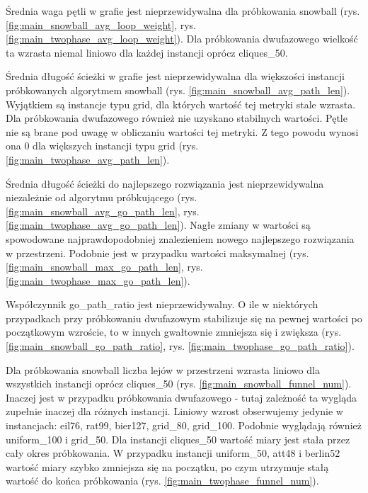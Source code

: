 Średnia waga pętli w grafie jest nieprzewidywalna dla próbkowania snowball (rys. \ref{fig:main_snowball_avg_loop_weight}, rys. \ref{fig:main_twophase_avg_loop_weight}).
Dla próbkowania dwufazowego wielkość ta wzrasta niemal liniowo dla każdej instancji oprócz cliques\_50.

Średnia długość ścieżki w grafie jest nieprzewidywalna dla większości instancji próbkowanych algorytmem snowball (rys. \ref{fig:main_snowball_avg_path_len}).
Wyjątkiem są instancje typu grid, dla których wartość tej metryki stale wzrasta.
Dla próbkowania dwufazowego również nie uzyskano stabilnych wartości.
Pętle nie są brane pod uwagę w obliczaniu wartości tej metryki. Z tego powodu wynosi ona 0 dla większych instancji typu grid (rys. \ref{fig:main_twophase_avg_path_len}).

Średnia długość ścieżki do najlepszego rozwiązania jest nieprzewidywalna niezależnie od algorytmu próbkującego (rys. \ref{fig:main_snowball_avg_go_path_len}, rys. \ref{fig:main_twophase_avg_go_path_len}).
Nagłe zmiany w wartości są spowodowane najprawdopodobniej znalezieniem nowego najlepszego rozwiązania w przestrzeni.
Podobnie jest w przypadku wartości maksymalnej (rys. \ref{fig:main_snowball_max_go_path_len}, rys. \ref{fig:main_twophase_max_go_path_len}).

Współczynnik go\_path\_ratio jest nieprzewidywalny. O ile w niektórych przypadkach przy próbkowaniu dwufazowym stabilizuje się na pewnej wartości
po początkowym wzroście, to w innych gwałtownie zmniejsza się i zwiększa (rys. \ref{fig:main_snowball_go_path_ratio}, rys. \ref{fig:main_twophase_go_path_ratio}).

Dla próbkowania snowball liczba lejów w przestrzeni wzrasta liniowo dla wszystkich instancji oprócz cliques\_50 (rys. \ref{fig:main_snowball_funnel_num}).
Inaczej jest w przypadku próbkowania dwufazowego - tutaj zależność ta wygląda zupełnie inaczej dla różnych instancji.
Liniowy wzrost obserwujemy jedynie w instancjach: eil76, rat99, bier127, grid\_80, grid\_100. Podobnie wyglądają również uniform\_100 i grid\_50.
Dla instancji cliques\_50 wartość miary jest stała przez cały okres próbkowania. W przypadku instancji uniform\_50, att48 i berlin52 wartość miary
szybko zmniejsza się na początku, po czym utrzymuje stałą wartość do końca próbkowania (rys. \ref{fig:main_twophase_funnel_num}).

